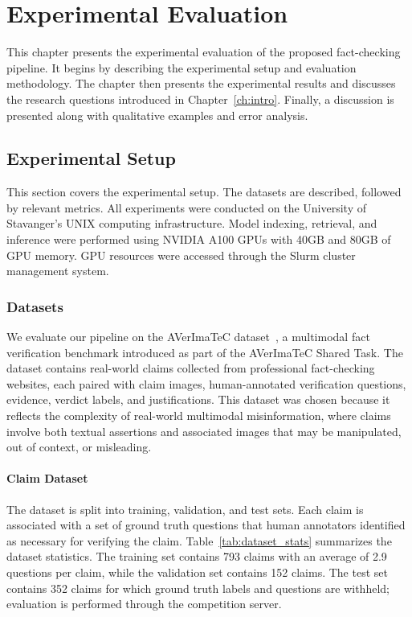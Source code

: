 \chapter{Experimental Evaluation}
\label{ch:eval}

This chapter presents the experimental evaluation of the proposed fact-checking pipeline. It begins by describing the experimental setup and evaluation methodology. The chapter then presents the experimental results and discusses the research questions introduced in Chapter~\ref{ch:intro}. Finally, a discussion is presented along with qualitative examples and error analysis.

\section{Experimental Setup}
This section covers the experimental setup. The datasets are described, followed by relevant metrics.
All experiments were conducted on the University of Stavanger's UNIX computing infrastructure. Model indexing, retrieval, and inference were performed using NVIDIA A100 GPUs with 40GB and 80GB of GPU memory. GPU resources were accessed through the Slurm cluster management system.

\subsection{Datasets}

We evaluate our pipeline on the AVerImaTeC dataset~\citep{Cao2025May}, a multimodal fact verification benchmark introduced as part of the AVerImaTeC Shared Task. The dataset contains real-world claims collected from professional fact-checking websites, each paired with claim images, human-annotated verification questions, evidence, verdict labels, and justifications. This dataset was chosen because it reflects the complexity of real-world multimodal misinformation, where claims involve both textual assertions and associated images that may be manipulated, out of context, or misleading.

\subsubsection{Claim Dataset}

The dataset is split into training, validation, and test sets. Each claim is associated with a set of ground truth questions that human annotators identified as necessary for verifying the claim. Table~\ref{tab:dataset_stats} summarizes the dataset statistics. The training set contains 793 claims with an average of 2.9 questions per claim, while the validation set contains 152 claims. The test set contains 352 claims for which ground truth labels and questions are withheld; evaluation is performed through the competition server.

